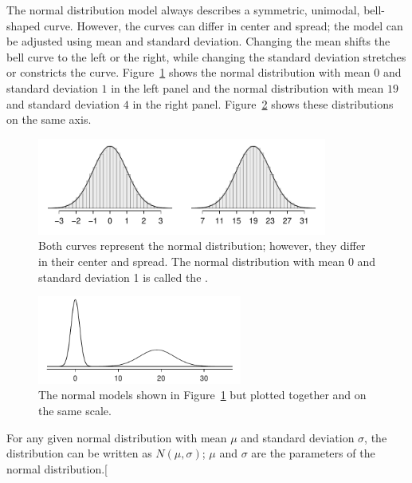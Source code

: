 The normal distribution model always describes a symmetric, unimodal, bell-shaped curve. However, the curves can differ in center and spread; the model can be adjusted using mean and standard deviation. Changing the mean shifts the bell curve to the left or the right, while changing the standard deviation stretches or constricts the curve. Figure~\ref{twoSampleNormals} shows the normal distribution with mean $0$ and standard deviation $1$ in the left panel and the normal distribution with mean $19$ and standard deviation $4$ in the right panel. Figure~\ref{twoSampleNormalsStacked} shows these distributions on the same axis.

\begin{figure}[hht]
\centering
\includegraphics[width=0.85\textwidth]{ch_distributions_oi_biostat/figures/twoSampleNormals/twoSampleNormals}
\caption{Both curves represent the normal distribution; however, they differ in their center and spread. The normal distribution with mean 0 and standard deviation 1 is called the .}
\label{twoSampleNormals}
\end{figure}

\begin{figure}[hht]
\centering
\includegraphics[width=0.6\textwidth]{ch_distributions_oi_biostat/figures/twoSampleNormalsStacked/twoSampleNormalsStacked}
\caption{The normal models shown in Figure~\ref{twoSampleNormals} but plotted together and on the same scale.}
\label{twoSampleNormalsStacked}
\end{figure}

For any given normal distribution with mean $\mu$ and standard deviation $\sigma$, the distribution can be written as $N(\mu, \sigma)$; $\mu$ and $\sigma$ are the parameters of the normal distribution.\marginpar[\raggedright\vspace{-5mm}

